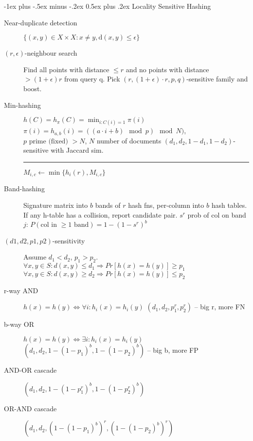 \documentclass[11pt,landscape]{article}
\makeatletter
\renewcommand{\section}{\@startsection{section}{1}{0mm}%
                                {-1ex plus -.5ex minus -.2ex}%
                                {0.5ex plus .2ex}%
                                {\color{sectionColor}\normalfont\normalsize\bfseries}}
\makeatother
\begin{document}
\begin{multicols}{3}
\section{Locality Sensitive Hashing}
    \begin{description}
        \item[Near-duplicate detection] $ \{ (x,y) \in X \times X : x \neq y, \text{d}(x,y) \leq \epsilon \}$
        \item[$(r,\epsilon)$-neighbour search]
        Find all points with distance $\leq r$ and no points with distance $> (1+ \epsilon)r$ from query q.
        Pick $(r,(1+\epsilon) \cdot r,p,q)$-sensitive family and boost.
        \item[Min-hashing] $h(C) = h_{\pi}(C) = \min_{i : C(i) = 1} \pi(i)$
            \subitem $\pi(i) = h_{a, b}(i) = ((a \cdot i + b) \mod p) \mod N)$,
        $p \text{ prime (fixed) } > N$, $N$ number of documents
        $(d_1, d_2, 1-d_1, 1-d_2)$-sensitive with Jaccard sim.
            \hrule
            \begin{algorithmic}[1]
                \State $M_{i,c} \gets \min\{h_i(r), M_{i,c}\}$
            \EndFor
        \EndIf
    \EndFor
\EndFor
\end{algorithmic}
        \item[Band-hashing] Signature matrix into $b$ bands of $r$ hash fns,
            per-column into $b$ hash tables. If any h-table has a collision,
            report candidate pair. $s^r$ prob of col on band $j$: $P(\text{col in } \geq 1 \text{ band}) = 1-(1-s^r)^b$
        \item[$(d1,d2,p1,p2)$-sensitivity] Assume $d_1<d_2$, $p_1>p_2$.
                $\forall x,y \in S: d(x,y) \leq d_1 \Rightarrow Pr[h(x)=h(y)] \geq p_1$\\
                $\forall x,y \in S: d(x,y) \geq d_2 \Rightarrow Pr[h(x)=h(y)] \leq p_2$
        \item[r-way AND] $h(x)=h(y) \iff \forall i : h_i(x)=h_i(y)$
            $(d_1,d_2,p_1^r,p_2^r)$ -- big r, more FN
        \item[b-way OR] $h(x)=h(y) \iff \exists i : h_i(x)=h_i(y)$
            $(d_1,d_2,1-(1-p_1)^b,1-(1-p_2)^b)$ -- big b, more FP
        \item[AND-OR cascade] $(d_1,d_2,1-(1-p_1^r)^b,1-(1-p_2^r)^b)$
        \item[OR-AND cascade] $(d_1,d_2,(1-(1-p_1)^b)^r,(1-(1-p_2)^b)^r)$
    \end{description}

\end{multicols}
\end{document}
